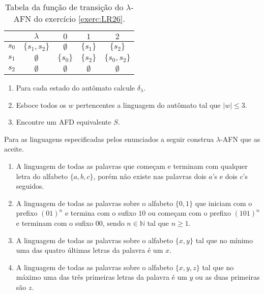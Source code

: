 \begin{table}[h]
	\centering
	\begin{tabular}{c|cccc}
		\backslashbox{$Q'$}{$\Sigma$}	& $\lambda$ & $0$ & $1$ & $2$\\\hline
		$s_0$ & $\{s_1, s_2\}$ & $\emptyset$  & $\{s_1\}$ & $\{s_2\}$\\
		$s_1$ & $\emptyset$ & $\{s_0\}$ & $\{s_2\}$ & $\{s_0, s_2\}$ \\
		$s_2$ & $\emptyset$ & $\emptyset$ & $\emptyset$ & $\emptyset$ 		
	\end{tabular}
	\caption{Tabela da função de transição do $\lambda$-AFN do exercício \ref{exerc:LR26}.}
	\label{tab:DeltaLAFN-Exe26}
\end{table}

\begin{enumerate}
	\item Para cada estado do autômato calcule $\delta_\lambda$.
	\item Esboce todos os $w$ pertencentes a linguagem do autômato tal que $|w| \leq 3$.
	\item Encontre um AFD equivalente $S$. 
\end{enumerate}

\begin{exercise}\label{exerc:LR27}
	Para as linguagens especificadas pelos enunciados a seguir construa $\lambda$-AFN que as aceite.
\end{exercise}

\begin{enumerate}
	\item A linguagem de todas as palavras que começam e terminam com qualquer letra do alfabeto $\{a,b,c\}$, porém não existe nas palavras dois $a$'s e dois $c$'s seguidos.
	\item A linguagem de todas as palavras sobre o alfabeto $\{0,1\}$ que iniciam com o prefixo $(01)^n$ e termina com o sufixo $10$ ou começam com o prefixo $(101)^n$ e terminam com o sufixo $00$, sendo $n \in \mathbb{N}$ tal que $n \geq 1$.
	\item A linguagem de todas as palavras sobre o alfabeto $\{x, y\}$ tal que no mínimo uma das quatro últimas letras da palavra é um $x$.
	\item A linguagem de todas as palavras sobre o alfabeto $\{x, y, z\}$ tal que no máximo uma das três primeiras letras da palavra é um $y$ ou as duas primeiras são $z$.
\end{enumerate}
